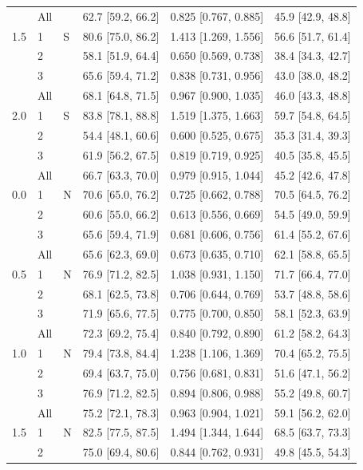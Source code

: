 \begin{table}[!htbp]
\begin{tabular}{@{}lllrrr@{}}
 & All &  & 62.7 [59.2, 66.2] & 0.825 [0.767, 0.885] & 45.9 [42.9, 48.8] \\
1.5 & 1 & S & 80.6 [75.0, 86.2] & 1.413 [1.269, 1.556] & 56.6 [51.7, 61.4] \\
 & 2 &  & 58.1 [51.9, 64.4] & 0.650 [0.569, 0.738] & 38.4 [34.3, 42.7] \\
 & 3 &  & 65.6 [59.4, 71.2] & 0.838 [0.731, 0.956] & 43.0 [38.0, 48.2] \\
 & All &  & 68.1 [64.8, 71.5] & 0.967 [0.900, 1.035] & 46.0 [43.3, 48.8] \\
2.0 & 1 & S & 83.8 [78.1, 88.8] & 1.519 [1.375, 1.663] & 59.7 [54.8, 64.5] \\
 & 2 &  & 54.4 [48.1, 60.6] & 0.600 [0.525, 0.675] & 35.3 [31.4, 39.3] \\
 & 3 &  & 61.9 [56.2, 67.5] & 0.819 [0.719, 0.925] & 40.5 [35.8, 45.5] \\
 & All &  & 66.7 [63.3, 70.0] & 0.979 [0.915, 1.044] & 45.2 [42.6, 47.8] \\
\midrule
0.0 & 1 & N & 70.6 [65.0, 76.2] & 0.725 [0.662, 0.788] & 70.5 [64.5, 76.2] \\
 & 2 &  & 60.6 [55.0, 66.2] & 0.613 [0.556, 0.669] & 54.5 [49.0, 59.9] \\
 & 3 &  & 65.6 [59.4, 71.9] & 0.681 [0.606, 0.756] & 61.4 [55.2, 67.6] \\
 & All &  & 65.6 [62.3, 69.0] & 0.673 [0.635, 0.710] & 62.1 [58.8, 65.5] \\
0.5 & 1 & N & 76.9 [71.2, 82.5] & 1.038 [0.931, 1.150] & 71.7 [66.4, 77.0] \\
 & 2 &  & 68.1 [62.5, 73.8] & 0.706 [0.644, 0.769] & 53.7 [48.8, 58.6] \\
 & 3 &  & 71.9 [65.6, 77.5] & 0.775 [0.700, 0.850] & 58.1 [52.3, 63.9] \\
 & All &  & 72.3 [69.2, 75.4] & 0.840 [0.792, 0.890] & 61.2 [58.2, 64.3] \\
1.0 & 1 & N & 79.4 [73.8, 84.4] & 1.238 [1.106, 1.369] & 70.4 [65.2, 75.5] \\
 & 2 &  & 69.4 [63.7, 75.0] & 0.756 [0.681, 0.831] & 51.6 [47.1, 56.2] \\
 & 3 &  & 76.9 [71.2, 82.5] & 0.894 [0.806, 0.988] & 55.2 [49.8, 60.7] \\
 & All &  & 75.2 [72.1, 78.3] & 0.963 [0.904, 1.021] & 59.1 [56.2, 62.0] \\
1.5 & 1 & N & 82.5 [77.5, 87.5] & 1.494 [1.344, 1.644] & 68.5 [63.7, 73.3] \\
 & 2 &  & 75.0 [69.4, 80.6] & 0.844 [0.762, 0.931] & 49.8 [45.5, 54.3] \\

\end{tabular}
\end{table}
